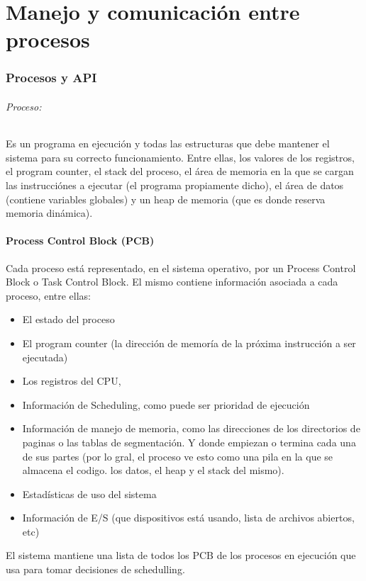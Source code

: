 \part{Manejo y comunicación entre procesos}
\section{Procesos y API}
\paragraph{Proceso:} Es un programa en ejecución y todas las estructuras que debe mantener el sistema para su correcto funcionamiento. Entre ellas, los valores de los registros, el program counter, el stack del proceso, el área de memoria en la que se cargan las instrucciónes a  ejecutar (el programa propiamente dicho), el área de datos (contiene variables globales) y un heap de memoria (que es donde reserva memoria dinámica).

\subsection{Process Control Block (PCB)}\label{process::pcb}
Cada proceso está representado, en el sistema operativo, por un Process Control Block o Task Control Block. El mismo contiene información asociada a cada proceso, entre ellas:
\begin{itemize}
    \item El estado del proceso
    \item El program counter (la dirección de memoría de la próxima instrucción a ser ejecutada)
    \item Los registros del CPU,
    \item Información de Scheduling, como puede ser prioridad de ejecución
    \item Información de manejo de memoria, como las direcciones de los directorios de paginas o las tablas de segmentación. Y donde empiezan o termina cada una de sus partes (por lo gral, el proceso ve esto como una pila en la que se almacena el codigo. los datos, el heap y el stack del mismo).
    \item Estadísticas de uso del sistema
    \item Información de E/S (que dispositivos está usando, lista de archivos abiertos, etc)
\end{itemize}

El sistema mantiene una lista de todos los PCB de los procesos en ejecución que usa para tomar decisiones de schedulling.

